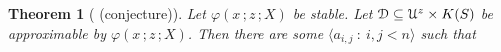 \documentclass{amsproc}
\makeatletter
\newcounter{thm}
\theoremstyle{mio}
\newtheorem{theorem}[thm]{Theorem}\tcolorboxenvironment{theorem}{mythm}
\newtheorem{fact}[thm]{Fact}\tcolorboxenvironment{fact}{mythm}
\providecommand{\proofNameStyle}{\bfseries}
\renewenvironment{proof}[1][\proofname]{\par
  \pushQED{\qed}%
  \normalfont%
  \trivlist
  \item[\hskip\labelsep
        \proofNameStyle
    #1\@addpunct{.}]\ignorespaces
}{%
  \popQED\endtrivlist\@endpefalse
}
\renewcommand*{\emph}[1]{%
   \smash{\tikz[baseline]\node[rectangle, fill=teal!25, rounded corners, inner xsep=0.5ex, inner ysep=0.2ex, anchor=base, minimum height = 2.7ex]{\strut #1};}}
\makeatother
\begin{document}
\begin{theorem}[ (conjecture)]
  Let $\varphi(x\,;z\,;X)$ be stable.
  Let ${\EuScript D}\subseteq {\EuScript U}^z\times K(S)$ be approximable by $\varphi(x\,;z\,;X)$.
  Then there are some $\langle a_{i,j}\ :\ i,j<n\rangle$ such that\medskip

  
\end{theorem}

\begin{proof}
  
\end{proof}

\begin{comment}
\section{Externally definable sets}

\emph{global $\varphi(x\,;z\,;X)$-type\/} is a maximally consistent set of formulas that are instances of $\varphi(x\,;b\,;X)$ and/or ${\sim}\varphi(x\,;b\,;X)$ for some $b\in{\EuScript U}^{|z|}$.


Let $p(x)$ be a global $\varphi(x\,;z\,;X)$-type.
We define 

\ceq{\hfill\emph{${\EuScript D}_{p,\varphi,C}$}}{=}{\big\{b\in{\EuScript U}^{z}\ :\ \varphi(x\,;b\,;C)\in p\big\}}

\begin{fact}\ \vskip-0.5\baselineskip
  
  \ceq{\hfill\neg{\EuScript D}_{p,\varphi,C}}{=}{\bigcup\Big\{{\EuScript D}_{p,{\sim}\varphi,\tilde C}\ \ :\ \ \tilde C\cap C=\varnothing\Big\}}
\end{fact}

\begin{proof}
  ($\subseteq$).
  Let $b\notin{\EuScript D}_{p,\varphi,C}$.
  Let $A\subseteq{\EuScript U}$ be such that every instance of $\varphi(x\,;b\,;X)$ and ${\sim}\varphi(x\,;b\,;X)$ that is consistent with $p(x)\restriction A$ is finitely consistent with $p(x)$.
  Finally pick $a\models p(x)\restriction A$.
  As $\neg\varphi(a,b,C)$, from Fact~\ref{fact_maximal} we obtain that  ${\sim}\varphi(a\,;b\,;\tilde C)$ holds for some $\tilde C\cap C=\varnothing$.
  Then ${\sim}\varphi(x\,;b\,;\tilde C)$ is consistent with $p(x)\restriction A$.
  By maximality of $p(x)$, we have ${\sim}\varphi(x\,;b\,;\tilde C)\in p$.
  Then $b\in{\EuScript D}_{p,{\sim}\varphi,\tilde C}$.
  

\end{comment}
\end{document}
